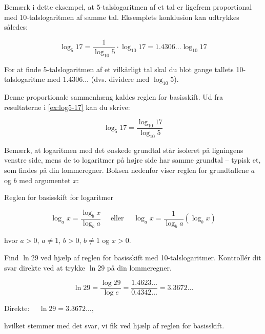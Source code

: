 Bemærk i dette eksempel, at 5-talslogaritmen af et tal er ligefrem proportional med 10-talslogaritmen af samme tal. Eksemplets konklusion kan udtrykkes således:

\[
\log_5 17 = \frac{1}{\log_{10} 5} \cdot \log_{10} 17 = 1.4306 \ldots \log_{10} 17
\]

For at finde 5-talslogaritmen af et vilkårligt tal skal du blot gange tallets 10-talslogaritme med \(1.4306 \ldots\) (dvs. dividere med \(\log_{10} 5\)).

Denne proportionale sammenhæng kaldes reglen for basisskift. Ud fra resultaterne i \autoref{ex:log5-17} kan du skrive:

\[
\log_5 17 = \frac{\log_{10} 17}{\log_{10} 5}
\]

Bemærk, at logaritmen med det ønskede grundtal står isoleret på ligningens venstre side, mens de to logaritmer på højre side har samme grundtal -- typisk et, som findes på din lommeregner. Boksen nedenfor viser reglen for grundtallene \(a\) og \(b\) med argumentet \(x\):

\begin{custombox}{Reglen for basisskift for logaritmer}

\begin{equation*}
\log _a x=\frac{\log_b x}{\log_b a} \quad \text { eller } \quad \log_a x=\frac{1}{\log_b a}\left(\log_b x\right)
\end{equation*}

hvor $a>0$, $a\neq 1$, $b>0$, $b\neq 1$ og $x>0$.
    
\end{custombox}

\begin{example}
Find $\ln 29$ ved hjælp af reglen for basisskift med 10-talslogaritmer. Kontrollér dit svar direkte ved at trykke $\ln 29$ på din lommeregner.

\begin{solution}

\[
\ln 29=\frac{\log 29}{\log e}=\frac{1.4623 \ldots}{0.4342 \ldots}=3.3672 \ldots
\]

\hspace{0.9cm} Direkte: $\quad \ln 29=3.3672 \ldots,$

hvilket stemmer med det svar, vi fik ved hjælp af reglen for basisskift.
\end{solution}
\end{example}

